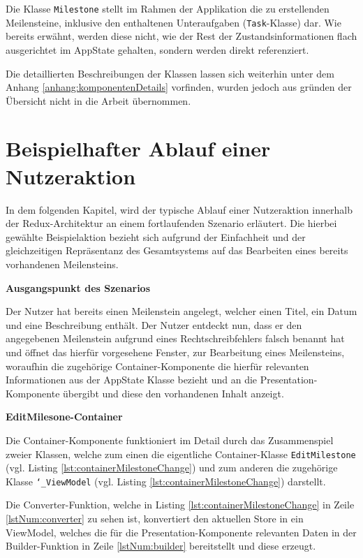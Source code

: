 \documentclass[bibliography=totoc,listof=totoc,BCOR=5mm,DIV=12,oneside]{scrbook}
\begin{document}
{\newpage
\par Die Klasse \texttt{Milestone} stellt im Rahmen der Applikation die zu erstellenden Meilensteine, inklusive den enthaltenen Unteraufgaben (\texttt{Task}-Klasse) dar. Wie bereits erwähnt, werden diese nicht, wie der Rest der Zustandsinformationen flach ausgerichtet im AppState gehalten, sondern werden direkt referenziert.

\par \bigskip Die detaillierten Beschreibungen der Klassen lassen sich weiterhin unter dem Anhang \ref{anhang:komponentenDetails} vorfinden, wurden jedoch aus gründen der Übersicht nicht in die Arbeit übernommen.
\section{Beispielhafter Ablauf einer Nutzeraktion}
\label{sec:beispielhafterAblauf}
\par In dem folgenden Kapitel, wird der typische Ablauf einer Nutzeraktion innerhalb der Redux-Architektur an einem fortlaufenden Szenario erläutert. Die hierbei gewählte Beispielaktion bezieht sich aufgrund der Einfachheit und der gleichzeitigen Repräsentanz des Gesamtsystems auf das Bearbeiten eines bereits vorhandenen Meilensteins.

\par \bigskip \textbf{Ausgangspunkt des Szenarios}
\par Der Nutzer hat bereits einen Meilenstein angelegt, welcher einen Titel, ein Datum und eine Beschreibung enthält. Der Nutzer entdeckt nun, dass er den angegebenen Meilenstein aufgrund eines Rechtschreibfehlers falsch benannt hat und öffnet das hierfür vorgesehene Fenster, zur Bearbeitung eines Meilensteins, woraufhin die zugehörige Container-Komponente die hierfür relevanten Informationen aus der AppState Klasse bezieht und an die Presentation-Komponente übergibt und diese den vorhandenen Inhalt anzeigt.

\par \bigskip \textbf{EditMilesone-Container}
\par Die Container-Komponente funktioniert im Detail durch das Zusammenspiel zweier Klassen, welche zum einen die eigentliche Container-Klasse \texttt{EditMilestone} (vgl. Listing \ref{lst:containerMilestoneChange}) und zum anderen die zugehörige Klasse \texttt{\char`_ViewModel} (vgl. Listing \ref{lst:containerMilestoneChange}) darstellt. 
\par Die Converter-Funktion, welche in Listing  \ref{lst:containerMilestoneChange} in Zeile \ref{lstNum:converter} zu sehen ist, konvertiert den aktuellen Store in ein ViewModel, welches die für die Presentation-Komponente relevanten Daten in der Builder-Funktion in Zeile \ref{lstNum:builder} bereitstellt und diese erzeugt.

}
\end{document}
